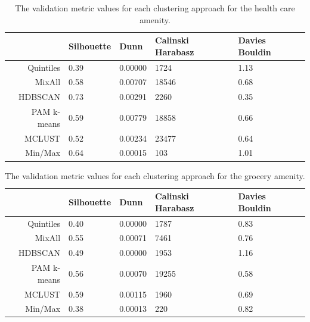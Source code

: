 \documentclass[11pt, a4paper]{article}
\begin{document}
\centering
\begin{longtable}[h]{|r|llll|}
\caption[Health care validation metrics]{The validation metric values for each clustering approach for the health care amenity.}\label{healthcarevalid}
\endfirsthead
\endhead
  \hline
 & Silhouette & Dunn & Calinski Harabasz & Davies Bouldin \\ 
  \hline
Quintiles & 0.39 & 0.00000 &  1724 & 1.13 \\ 
   \hline
MixAll & 0.58 & 0.00707 & 18546 & 0.68 \\ 
   \hline
HDBSCAN & \cellcolor{gray!25} 0.73 & \cellcolor{gray!25} 0.00291 &  2260 & \cellcolor{gray!25} 0.35 \\ 
   \hline
PAM k-means & 0.59 & 0.00779 & 18858 & 0.66 \\ 
   \hline
MCLUST & 0.52 & 0.00234 & \cellcolor{gray!25} 23477 & 0.64 \\ 
   \hline
Min/Max & 0.64 & 0.00015 &   103 & 1.01 \\ 
   \hline
\end{longtable}









\centering
\begin{longtable}[h]{|r|llll|}
\caption[Grocery validation metrics]{The validation metric values for each clustering approach for the grocery amenity.}\label{groceryvalid}
\endfirsthead
\endhead
  \hline
 & Silhouette & Dunn & Calinski Harabasz & Davies Bouldin \\ 
  \hline
Quintiles & 0.40 & 0.00000 &  1787 & 0.83 \\ 
   \hline
MixAll & 0.55 & 0.00071 &  7461 & 0.76 \\ 
   \hline
HDBSCAN & 0.49 & 0.00000 &  1953 & 1.16 \\ 
   \hline
PAM k-means & 0.56 & 0.00070 & \cellcolor{gray!25} 19255 & \cellcolor{gray!25} 0.58 \\ 
   \hline
MCLUST & \cellcolor{gray!25} 0.59 & \cellcolor{gray!25} 0.00115 &  1960 & 0.69 \\ 
   \hline
Min/Max & 0.38 & 0.00013 &   220 & 0.82 \\ 
   \hline
\end{longtable}
\end{document}
